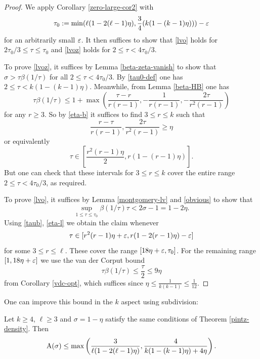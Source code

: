 \begin{proof} We apply Corollary \ref{zero-large-cor2} with
\begin{equation}\label{tau0-def}
\tau_0 := \min( \ell (1 - 2(\ell-1) \eta), \frac{3}{4} (k(1-(k-1)\eta)) ) - \varepsilon
\end{equation}
for an arbitrarily small $\varepsilon$.
It then suffices to show that \eqref{lvo} holds for $2\tau_0/3 \leq \tau \leq \tau_0$ and \eqref{lvoz} holds for $2 \leq \tau < 4\tau_0/3$.

To prove \eqref{lvoz}, it suffices by Lemma \ref{beta-zeta-vanish} to show that $\sigma > \tau \beta(1/\tau)$ for all $2 \leq \tau < 4 \tau_0/3$.  By \eqref{tau0-def} one has $2 \leq \tau < k(1-(k-1)\eta)$.  Meanwhile, from Lemma \ref{beta-HB} one has
\begin{equation}\label{taub}
\tau \beta(1/\tau) \leq 1 + \max\left( \frac{\tau-r}{r(r-1)}, -\frac{1}{r(r-1)}, - \frac{2\tau}{r^2(r-1)}\right)
\end{equation}
for any $r \geq 3$.  So by \eqref{eta-b} it suffices to find $3 \leq r \leq k$ such that
$$ \frac{r-\tau}{r(r-1)}, \frac{2\tau}{r^2(r-1)} \geq \eta$$
or equivalently
$$ \tau \in [\frac{r^2(r-1)\eta}{2}, r(1-(r-1)\eta)].$$
But one can check that these intervals for $3 \leq r \leq k$ cover the entire range $2 \leq \tau < 4\tau_0/3$, as required.

To prove \eqref{lvo}, it suffices by Lemma \ref{montgomery-lv} and \eqref{obvious} to show that
$$ \sup_{1 \leq \tau \leq \tau_0} \beta(1/\tau) \tau < 2\sigma - 1 = 1 - 2 \eta.$$
Using \eqref{taub}, \eqref{eta-l} we obtain the claim whenever
$$ \tau \in [r^2(r-1)\eta+\varepsilon, r(1-2(r-1)\eta)-\varepsilon]$$
for some $3 \leq r \leq \ell$.  These cover the range $[18\eta+\varepsilon, \tau_0]$.  For the remaining range $[1, 18\eta+\varepsilon]$ we use the van der Corput bound
$$ \tau \beta(1/\tau) \leq \frac{\tau}{2} \leq 9 \eta$$
from Corollary \ref{vdc-opt}, which suffices since $\eta \leq \frac{1}{k(k-1)} \leq \frac{1}{12}$.
\end{proof}

One can improve this bound in the $k$ aspect using subdivision:

\begin{theorem}\label{pintz-density-subdiv} Let $k \geq 4$, $\ell \geq 3$ and $\sigma = 1-\eta$ satisfy the same conditions of Theorem \ref{pintz-density}. Then
$$ \mathrm{A}(\sigma) \leq \max\left( \frac{3}{\ell(1-2(\ell-1)\eta)}, \frac{4}{k(1 - (k - 1)\eta) + 4\eta}\right).$$
\end{theorem}

